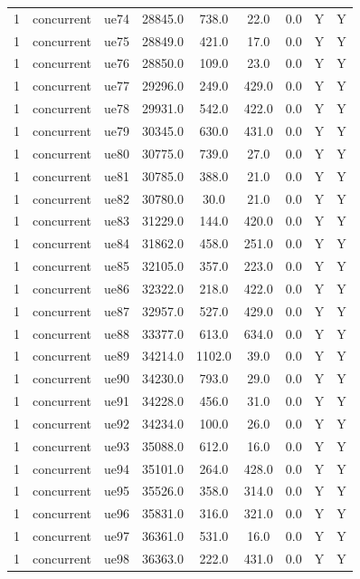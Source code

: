 \begin{table}[ht]
\begin{tabular}{|c|c|c|c|c|c|c|c|c|}
1 & concurrent & ue74 & 28845.0 & 738.0 & 22.0 & 0.0 & Y & Y \\
1 & concurrent & ue75 & 28849.0 & 421.0 & 17.0 & 0.0 & Y & Y \\
1 & concurrent & ue76 & 28850.0 & 109.0 & 23.0 & 0.0 & Y & Y \\
1 & concurrent & ue77 & 29296.0 & 249.0 & 429.0 & 0.0 & Y & Y \\
1 & concurrent & ue78 & 29931.0 & 542.0 & 422.0 & 0.0 & Y & Y \\
1 & concurrent & ue79 & 30345.0 & 630.0 & 431.0 & 0.0 & Y & Y \\
1 & concurrent & ue80 & 30775.0 & 739.0 & 27.0 & 0.0 & Y & Y \\
1 & concurrent & ue81 & 30785.0 & 388.0 & 21.0 & 0.0 & Y & Y \\
1 & concurrent & ue82 & 30780.0 & 30.0 & 21.0 & 0.0 & Y & Y \\
1 & concurrent & ue83 & 31229.0 & 144.0 & 420.0 & 0.0 & Y & Y \\
1 & concurrent & ue84 & 31862.0 & 458.0 & 251.0 & 0.0 & Y & Y \\
1 & concurrent & ue85 & 32105.0 & 357.0 & 223.0 & 0.0 & Y & Y \\
1 & concurrent & ue86 & 32322.0 & 218.0 & 422.0 & 0.0 & Y & Y \\
1 & concurrent & ue87 & 32957.0 & 527.0 & 429.0 & 0.0 & Y & Y \\
1 & concurrent & ue88 & 33377.0 & 613.0 & 634.0 & 0.0 & Y & Y \\
1 & concurrent & ue89 & 34214.0 & 1102.0 & 39.0 & 0.0 & Y & Y \\
1 & concurrent & ue90 & 34230.0 & 793.0 & 29.0 & 0.0 & Y & Y \\
1 & concurrent & ue91 & 34228.0 & 456.0 & 31.0 & 0.0 & Y & Y \\
1 & concurrent & ue92 & 34234.0 & 100.0 & 26.0 & 0.0 & Y & Y \\
1 & concurrent & ue93 & 35088.0 & 612.0 & 16.0 & 0.0 & Y & Y \\
1 & concurrent & ue94 & 35101.0 & 264.0 & 428.0 & 0.0 & Y & Y \\
1 & concurrent & ue95 & 35526.0 & 358.0 & 314.0 & 0.0 & Y & Y \\
1 & concurrent & ue96 & 35831.0 & 316.0 & 321.0 & 0.0 & Y & Y \\
1 & concurrent & ue97 & 36361.0 & 531.0 & 16.0 & 0.0 & Y & Y \\
1 & concurrent & ue98 & 36363.0 & 222.0 & 431.0 & 0.0 & Y & Y \\

\end{tabular}
\end{table}
